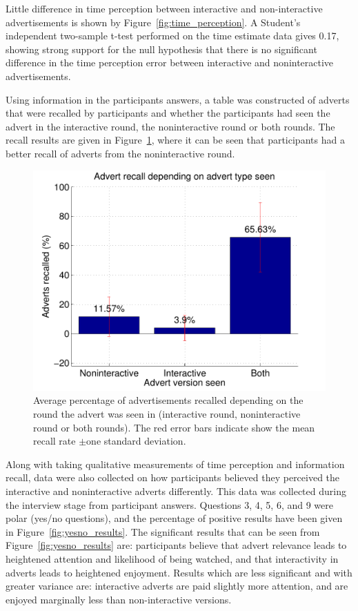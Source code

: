 	Little difference in time perception between interactive and non-interactive advertisements is shown by Figure~\ref{fig:time_perception}. A Student's independent two-sample t-test performed on the time estimate data gives 0.17, showing strong support for the null hypothesis that there is no significant difference in the time perception error between interactive and noninteractive advertisements.

	Using information in the participants answers, a table was constructed of adverts that were recalled by participants and whether the participants had seen the advert in the interactive round, the noninteractive round or both rounds. The recall results are given in Figure~\ref{fig:recall}, where it can be seen that participants had a better recall of adverts from the noninteractive round. 
	\begin{figure}[h!]
		\centering
		\includegraphics[width=\textwidth]{images/recall.pdf}
		\caption{Average percentage of advertisements recalled depending on the round the advert was seen in (interactive round, noninteractive round or both rounds). The red error bars indicate show the mean recall rate $\pm$one standard deviation.}
		\label{fig:recall}
	\end{figure}

	Along with taking qualitative measurements of time perception and information recall, data were also collected on how participants believed they perceived the interactive and noninteractive adverts differently. This data was collected during the interview stage from participant answers. Questions 3, 4, 5, 6, and 9 were polar (yes/no questions), and the percentage of positive results have been given in Figure~\ref{fig:yesno_results}. The significant results that can be seen from Figure~\ref{fig:yesno_results} are: participants believe that advert relevance leads to heightened attention and likelihood of being watched, and that interactivity in adverts leads to heightened enjoyment. Results which are less significant and with greater variance are: interactive adverts are paid slightly more attention, and are enjoyed marginally less than non-interactive versions.

